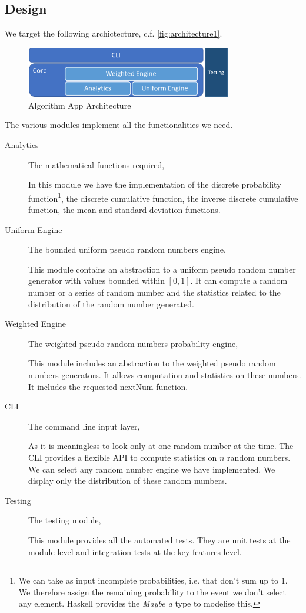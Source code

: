 \documentclass[12pt,a4paper,article]{memoir} %
\begin{document}
\subsection{Design}
We target the following archictecture, c.f. \autoref{fig:architecture1}.
\begin{figure}[h!]
\begin{center}
\includegraphics[width=0.8\textwidth]{img/architecture1.png}
\caption{Algorithm App Architecture}
\label{fig:architecture1}
\end{center}
\end{figure}
The various modules implement all the functionalities we need.
\begin{description}
	\item[Analytics] The mathematical functions required,
	
	In this module we have the implementation of the discrete 
	probability function\footnote{
	We can take as input incomplete probabilities, i.e. that
	don't sum up to $1$. We therefore assign the remaining
	probability to the event we don't select any element.
	Haskell provides the \emph{Maybe a} type to modelise this.
	}, the discrete cumulative function, 
	the inverse discrete cumulative function, the mean and
	standard deviation functions.
	
	\item[Uniform Engine] The bounded uniform 
	pseudo random numbers engine,
	
	This module contains an abstraction to a uniform pseudo
	random number generator with values bounded 
	within $ \left[ 0, 1 \right]$.
	It can compute a random number or a series of random 
	number and the statistics related to the distribution of 
	the random number generated.
	\item[Weighted Engine] 	The weighted pseudo random 
	numbers probability engine,
	
	This module includes an abstraction to the weighted 
	pseudo random numbers generators.
	It allows computation and statistics on these numbers.
	It includes the requested nextNum function.
	\item[CLI] 		The command line input layer,
	
	As it is meaningless to look only at one random number at the time.
	The CLI provides a flexible API to compute
	statistics on $n$ random numbers.
	We can select any random number engine we have implemented.
	We display only the distribution of these random numbers.
	\item[Testing] 	The testing module,
	
	This module provides all the automated tests. They are unit 
	tests at the module level and integration tests at the key
	features level.
\end{description}
\end{document}
